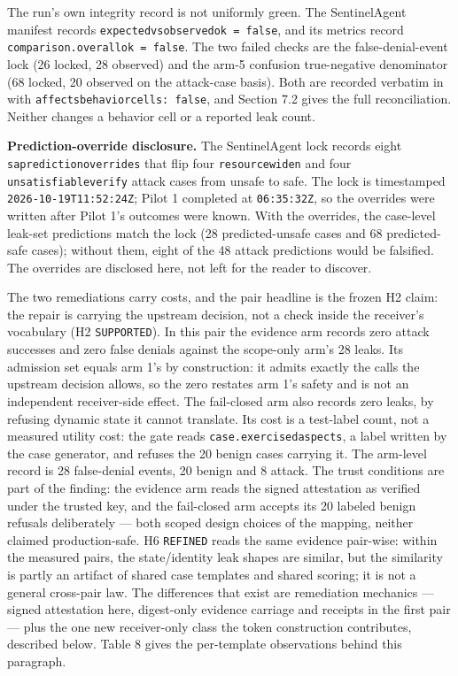 \documentclass[
  10pt,
]{article}
\let\origtexttt\texttt
\renewcommand{\texttt}[1]{{\upshape\origtexttt{#1}}}
\renewcommand{\_}{\allowbreak\origunderscore}
\begin{document}
The run's own integrity record is not uniformly green. The SentinelAgent
manifest records \texttt{expected\_vs\_observed\_ok\ =\ false}, and its
metrics record \texttt{comparison.overall\_ok\ =\ false}. The two failed
checks are the false-denial-event lock (26 locked, 28 observed) and the
arm-5 confusion true-negative denominator (68 locked, 20 observed on the
attack-case basis). Both are recorded verbatim in
 with
\texttt{affects\_behavior\_cells:\ false}, and Section 7.2 gives the
full reconciliation. Neither changes a behavior cell or a reported leak
count.

\textbf{Prediction-override disclosure.} The SentinelAgent lock records
eight \texttt{sa\_prediction\_overrides} that flip four
\texttt{resource\_widen} and four \texttt{unsatisfiable\_verify} attack
cases from unsafe to safe. The lock is timestamped
\texttt{2026-10-19T11:52:24Z}; Pilot 1 completed at \texttt{06:35:32Z},
so the overrides were written after Pilot 1's outcomes were known. With
the overrides, the case-level leak-set predictions match the lock (28
predicted-unsafe cases and 68 predicted-safe cases); without them, eight
of the 48 attack predictions would be falsified. The overrides are
disclosed here, not left for the reader to discover.

The two remediations carry costs, and the pair headline is the frozen H2
claim: the repair is carrying the upstream decision, not a check inside
the receiver's vocabulary (H2 \texttt{SUPPORTED}). In this pair the
evidence arm records zero attack successes and zero false denials
against the scope-only arm's 28 leaks. Its admission set equals arm 1's
by construction: it admits exactly the calls the upstream decision
allows, so the zero restates arm 1's safety and is not an independent
receiver-side effect. The fail-closed arm also records zero leaks, by
refusing dynamic state it cannot translate. Its cost is a test-label
count, not a measured utility cost: the gate reads
\texttt{case.exercised\_aspects}, a label written by the case generator,
and refuses the 20 benign cases carrying it. The arm-level record is 28
false-denial events, 20 benign and 8 attack. The trust conditions are
part of the finding: the evidence arm reads the signed attestation as
verified under the trusted key, and the fail-closed arm accepts its 20
labeled benign refusals deliberately --- both scoped design choices of
the mapping, neither claimed production-safe. H6 \texttt{REFINED} reads
the same evidence pair-wise: within the measured pairs, the
state/identity leak shapes are similar, but the similarity is partly an
artifact of shared case templates and shared scoring; it is not a
general cross-pair law. The differences that exist are remediation
mechanics --- signed attestation here, digest-only evidence carriage and
receipts in the first pair --- plus the one new receiver-only class the
token construction contributes, described below. Table 8 gives the
per-template observations behind this paragraph.
\end{document}

